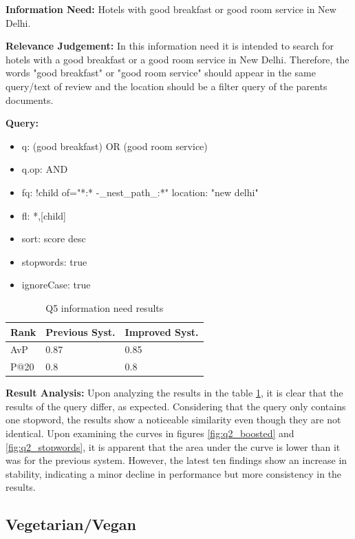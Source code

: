 \documentclass[sigconf]{acmart}
\begin{document}
\textbf{Information Need:} Hotels with good breakfast or good room service in New Delhi.

\textbf{Relevance Judgement:} In this information need it is intended to search for hotels with a good breakfast or a good room service in New Delhi. Therefore, the words "good breakfast" or "good room service" should appear in the same query/text of review and the location should be a filter query of the parents documents.

\textbf{Query:}

\begin{itemize}
    \item q: (good breakfast) OR (good room service)
    \item q.op: AND
    \item fq: {!child of="*:* -\_nest\_path\_:*"} location: "new delhi"
    \item fl: *,[child]
    \item sort: score desc
    \item stopwords: true
    \item ignoreCase: true
\end{itemize}

\begin{table}[H]
\caption{Q5 information need results}
\label{tab:q5}
\begin{tabular}{lll}
\toprule
Rank & Previous Syst. & Improved Syst.\\
\midrule
AvP & 0.87 & 0.85  \\
P@20 & 0.8 & 0.8 \\
\bottomrule
\end{tabular}
\end{table}

\textbf{Result Analysis:} Upon analyzing the results in the table \ref{tab:q5}, it is clear that the results of the query differ, as expected. Considering that the query only contains one stopword, the results show a noticeable similarity even though they are not identical.
Upon examining the curves in figures \ref{fig:q2_boosted} and \ref{fig:q2_stopwords}, it is apparent that the area under the curve is lower than it was for the previous system. However, the latest ten findings show an increase in stability, indicating a minor decline in performance but more consistency in the results.

\subsection{Vegetarian/Vegan}
\end{document}
